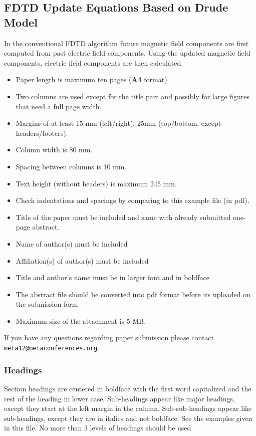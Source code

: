 \documentclass{article}
\begin{document}
\subsection{FDTD Update Equations Based on Drude Model}

In the conventional FDTD algorithm future magnetic field components are first computed from past electric field components. Using the updated magnetic field components, electric field components are then calculated.
\begin{itemize}
\setlength{\itemsep}{-1mm}
\item Paper length is maximum ten pages ({\bf A4} format)
\item Two columns are used except for the title part and possibly for large figures that need a full page width.
\item Margins of at least 15 mm (left/right), 25mm (top/bottom, except headers/footers).
\item Column width is 80 mm.
\item Spacing between columns is 10 mm.
\item Text height (without headers) is maximum 245 mm.
\item Check indentations and spacings by comparing to this example file (in pdf).
\item Title of the paper must be included and same with already submitted one-page abstract.
\item Name of author(s) must be included
\item Affiliation(s) of author(s) must be included
\item Title and author's name must be in larger font and in boldface
\item The abstract file should be converted into pdf format before its uploaded on the submission form
\item Maximum size of the attachment is 5 MB.
\end{itemize}

If you have any questions regarding paper submission please contact {\tt \small meta12@metaconferences.org}. 

\subsubsection{Headings}

Section headings are centered in boldface with the first word capitalized and the rest of the heading in lower case. 
Sub-headings appear like major headings, except they start at the left margin in the column.
Sub-sub-headings appear like sub-headings, except they are in italics and not boldface. 
See the examples given in this  file. 
No more than 3 levels of headings should be used.
\end{document}
